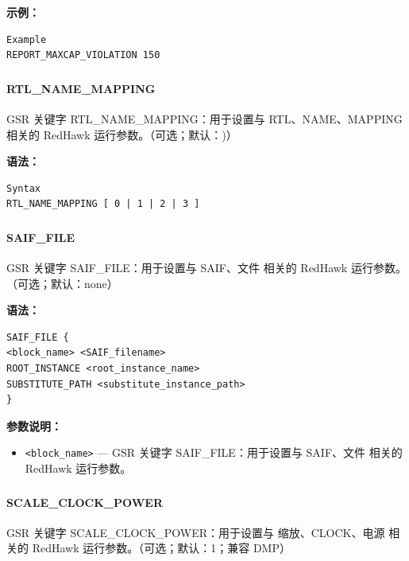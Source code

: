 \textbf{示例：}
\begin{lstlisting}
Example
REPORT_MAXCAP_VIOLATION 150
\end{lstlisting}

\subsubsection{}
\paragraph*{RTL_NAME_MAPPING}

GSR 关键字 RTL_NAME_MAPPING：用于设置与 RTL、NAME、MAPPING 相关的 RedHawk 运行参数。（可选；默认：)）

\textbf{语法：}
\begin{lstlisting}
Syntax
RTL_NAME_MAPPING [ 0 | 1 | 2 | 3 ]
\end{lstlisting}

\subsubsection{}
\paragraph*{SAIF_FILE}

GSR 关键字 SAIF_FILE：用于设置与 SAIF、文件 相关的 RedHawk 运行参数。（可选；默认：none）

\textbf{语法：}
\begin{lstlisting}
SAIF_FILE {
<block_name> <SAIF_filename>
ROOT_INSTANCE <root_instance_name>
SUBSTITUTE_PATH <substitute_instance_path>
}
\end{lstlisting}

\textbf{参数说明：}
\begin{itemize}
\item \texttt{<block\_name>} — GSR 关键字 SAIF\_FILE：用于设置与 SAIF、文件 相关的 RedHawk 运行参数。
\end{itemize}

\subsubsection{}
\paragraph*{SCALE_CLOCK_POWER}

GSR 关键字 SCALE_CLOCK_POWER：用于设置与 缩放、CLOCK、电源 相关的 RedHawk 运行参数。（可选；默认：1；兼容 DMP）

